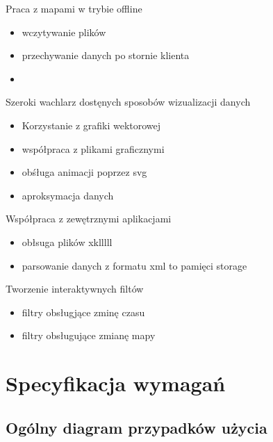Praca z mapami w trybie offline
\begin{itemize}
\item
wczytywanie plików

\item
przechywanie danych po stornie klienta

\item


\end{itemize}

Szeroki wachlarz dostęnych sposobów wizualizacji danych
\begin{itemize}
\item
Korzystanie z grafiki wektorowej

\item
współpraca z plikami graficznymi

\item
obśługa animacji poprzez svg

\item
aproksymacja danych

\end{itemize}

Współpraca z zewętrznymi aplikacjami
\begin{itemize}
\item
obłsuga plików xklllll

\item
parsowanie danych z formatu xml to pamięci storage
\end{itemize}

Tworzenie interaktywnych filtów
\begin{itemize}
\item
filtry obsługjące zminę czasu 

\item
filtry obsługujące zmianę mapy

\end{itemize}

\section{Specyfikacja wymagań}
\label{sec:specyfikacja wymagan}

\subsection{Ogólny diagram przypadków użycia}

